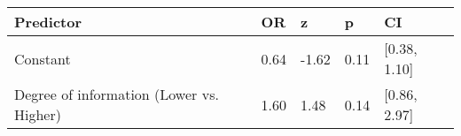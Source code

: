 \begin{tabular}{lllll}
  \toprule
Predictor & OR & z & p & CI \\ 
  \midrule
Constant & 0.64 & -1.62 & 0.11 & [0.38, 1.10] \\ 
  Degree of information (Lower vs. Higher) & 1.60 & 1.48 & 0.14 & [0.86, 2.97] \\ 
   \bottomrule
\end{tabular}
